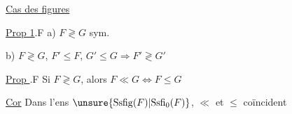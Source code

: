 \uline{Cas des figures}

\uline{Prop 1}.F a) $F\gtrless G$ sym. 

b) $F\gtrless G$, $F'\leq F$, $G'\leq G\Longrightarrow F'\gtrless G'$

\uline{Prop }.F Si $F\gtrless G$,  alors $F\ll G\Longleftrightarrow F\leq G$

\uline{Cor} Dans l'ens  $\unsure{\mathrm{Ssfig}(F)|\mathrm{Ssfi}_0(F)}$, $\ll$ et $\leq$ coïncident
